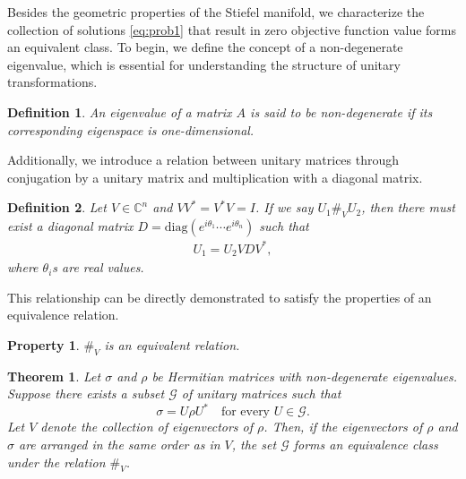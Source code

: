 \documentclass[sn-mathphys-num]{sn-jnl}%
\newtheorem{property}{Property}[section]
\theoremstyle{thmstyleone}%
\newtheorem{theorem}{Theorem}%
\theoremstyle{thmstyletwo}%
\theoremstyle{thmstylethree}%
\newtheorem{definition}{Definition}%
\begin{document}
Besides the geometric properties of the Stiefel manifold, we characterize the collection of solutions \eqref{eq:prob1} that result in zero objective function value forms an equivalent class. {To begin, we define the concept of a non-degenerate eigenvalue, which is essential for understanding the structure of unitary transformations.}

\begin{definition}
    An eigenvalue of a matrix $A$ is said to be \emph{non-degenerate} if its corresponding eigenspace is one-dimensional.
\end{definition}
{Additionally, we introduce a relation between unitary matrices through conjugation by a unitary matrix and multiplication with a diagonal matrix.
}
\begin{definition}
   Let $V\in \mathbb{C}^n$ and $VV^* = V^*V = I$. If we say $U_1\#_VU_2$, then there must exist a diagonal matrix $D = \mbox{diag}(e^{i\theta_1}\cdots e^{i\theta_n})$ such that 
   \begin{eqnarray*}
       U_1 = U_2 VDV^*,
   \end{eqnarray*}
   where $\theta_i$s are real values.
\end{definition}
{This relationship can be directly demonstrated to satisfy the properties of an equivalence relation.}
\begin{property}
    $\#_V$ is an equivalent relation.
\end{property}
\begin{theorem}\label{thm:one-theorem}
Let $\sigma$ and $\rho$ be Hermitian matrices with non-degenerate eigenvalues. Suppose there exists a subset $\mathcal{G}$ of unitary matrices  such that  
\[
\sigma = U \rho U^* \quad \text{for every } U \in \mathcal{G}.
\]
{
Let $V$ denote the collection of eigenvectors of $\rho$. Then, if the eigenvectors of $\rho$ and $\sigma$ are arranged in the same order as in $V$, the set $\mathcal{G}$ forms an equivalence class under the relation $\#_{V}$.
}
\end{theorem}
\end{document}
